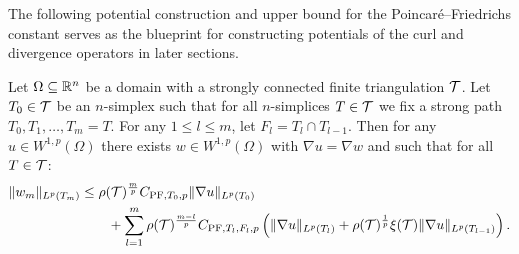 \documentclass[12pt,a4paper]{article}
\begin{document}
The following potential construction and upper bound for the Poincar\'e--Friedrichs constant 
serves as the blueprint for constructing potentials of the curl and divergence operators in later sections. 

\begin{theorem}\label{theorem:poincarefriedrichsestimate:gradzwei}
    Let $\Omega \subseteq {\mathbb R}^{n}$ be a domain with a strongly connected finite triangulation ${\mathcal T}$.
    Let $T_0 \in {\mathcal T}$ be an $n$-simplex such that for all $n$-simplices $T \in {\mathcal T}$ 
    we fix a strong path $T_0, T_1, \dots, T_m = T$.
    For any $1 \leq l \leq m$, let $F_{l} = T_{l} \cap T_{l-1}$.
    Then for any $u \in W^{1,p}(\Omega)$ 
    there exists $w \in W^{1,p}(\Omega)$ with $\nabla u = \nabla w$ 
    and such that for all $T \in {\mathcal T}$:
    \begin{align*}
        \| w_{m} \|_{L^{p}(T_m)}
        &\leq 
        \rho({\mathcal T})^{\frac m p}
        C_{{\rm PF},T_{0},p} 
        \| \nabla u \|_{L^{p}( T_{0} )}
        \\&\qquad 
        +
        \sum_{l=1}^{m} 
        \rho({\mathcal T})^{\frac {m-l} p}
        C_{{\rm PF},T_{l},F_{l},p} 
        \left( 
            \| \nabla u \|_{L^{p}(T_{l})} 
            +
            \rho({\mathcal T})^{\frac {1} p}
            \xi({\mathcal T})
            \| \nabla u \|_{L^{p}(T_{l-1})} 
        \right)
        .
    \end{align*}
\end{theorem}
\end{document}
